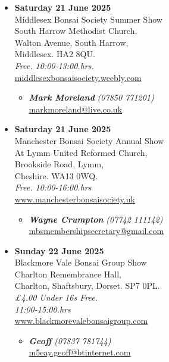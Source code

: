 \begin{itemize}
    \item \textbf{Saturday 21 June 2025}
    \\
    Middlesex Bonsai Society Summer Show \\
    South Harrow Methodist Church, \\
    Walton Avenue, South Harrow, \\
    Middlesex. HA2 8QU.
    \\
    \emph{Free. 10:00-13:00.hrs.}
    \\
    \href{https://middlesexbonsaisociety.weebly.com/}{middlesexbonsaisociety.weebly.com}
    \begin{itemize}
        \item \textbf{\emph{Mark Moreland}} \emph{(07850 771201)} \\
        \href{mailto:markmoreland@live.co.uk}{markmoreland@live.co.uk} 
    \end{itemize}

    \item \textbf{Saturday 21 June 2025}
    \\
    Manchester Bonsai Society Annual Show \\
    At Lymm United Reformed Church, \\
    Brookside Road, Lymm, \\
    Cheshire. WA13 0WQ.
    \\
    \emph{Free. 10:00-16:00.hrs}
    \\
    \href{https://www.manchesterbonsaisociety.uk}{www.manchesterbonsaisociety.uk}
    \begin{itemize}
        \item \textbf{\emph{Wayne Crumpton}} \emph{(07742 111142)} \\
        \href{mailto:mbsmembershipsecretary@gmail.com}{mbsmembershipsecretary@gmail.com} 
    \end{itemize}

    \item \textbf{Sunday 22 June 2025}
    \\
    Blackmore Vale Bonsai Group Show \\
    Charlton Remembrance Hall, \\
    Charlton, Shaftsbury, Dorset. SP7 0PL.
    \\
    \emph{£4.00 Under 16s Free.} \\
    \emph{11:00-15:00.hrs}
    \\
    \href{https://www.blackmorevalebonsaigroup.com}{www.blackmorevalebonsaigroup.com}
    \begin{itemize}
        \item \textbf{\emph{Geoff}} \emph{(07837 781744)} \\
        \href{mailto:m5eay.geoff@btinternet.com}{m5eay.geoff@btinternet.com} 
    \end{itemize}


\end{itemize}
